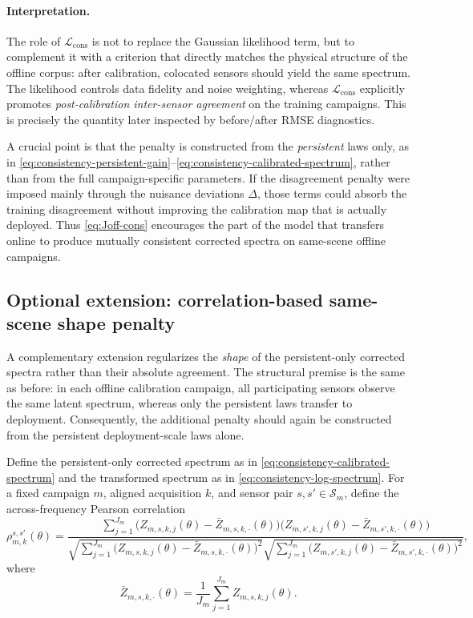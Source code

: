 \paragraph{Interpretation.}
The role of $\mathcal L_{\mathrm{cons}}$ is not to replace the Gaussian
likelihood term, but to complement it with a criterion that directly matches
the physical structure of the offline corpus: after calibration, colocated
sensors should yield the same spectrum. The likelihood controls data fidelity
and noise weighting, whereas $\mathcal L_{\mathrm{cons}}$ explicitly promotes
\emph{post-calibration inter-sensor agreement} on the training campaigns.
This is precisely the quantity later inspected by before/after RMSE
diagnostics.

A crucial point is that the penalty is constructed from the \emph{persistent}
laws only, as in
\eqref{eq:consistency-persistent-gain}--\eqref{eq:consistency-calibrated-spectrum},
rather than from the full campaign-specific parameters. If the disagreement
penalty were imposed mainly through the nuisance deviations $\Delta$, those
terms could absorb the training disagreement without improving the calibration
map that is actually deployed. Thus
\eqref{eq:Joff-cons} encourages the part of the model that transfers online to
produce mutually consistent corrected spectra on same-scene offline campaigns.

\subsection{Optional extension: correlation-based same-scene shape penalty}

A complementary extension regularizes the \emph{shape} of the persistent-only
corrected spectra rather than their absolute agreement. The structural premise
is the same as before: in each offline calibration campaign, all participating
sensors observe the same latent spectrum, whereas only the persistent laws
transfer to deployment. Consequently, the additional penalty should again be
constructed from the persistent deployment-scale laws alone.

Define the persistent-only corrected spectrum as in
\eqref{eq:consistency-calibrated-spectrum} and the transformed spectrum as in
\eqref{eq:consistency-log-spectrum}. For a fixed campaign $m$, aligned
acquisition $k$, and sensor pair
$s,s'\in\mathcal S_m$, define the across-frequency Pearson correlation
\begin{equation}
\rho_{m,k}^{s,s'}(\theta)
=
\frac{
\sum_{j=1}^{J_m}
\bigl(
Z_{m,s,k,j}(\theta)
-
\bar Z_{m,s,k,\cdot}(\theta)
\bigr)
\bigl(
Z_{m,s',k,j}(\theta)
-
\bar Z_{m,s',k,\cdot}(\theta)
\bigr)
}{
\sqrt{
\sum_{j=1}^{J_m}
\bigl(
Z_{m,s,k,j}(\theta)
-
\bar Z_{m,s,k,\cdot}(\theta)
\bigr)^2
}
\sqrt{
\sum_{j=1}^{J_m}
\bigl(
Z_{m,s',k,j}(\theta)
-
\bar Z_{m,s',k,\cdot}(\theta)
\bigr)^2
}
},
\label{eq:corr-pairwise-correlation}
\end{equation}
where
\begin{equation}
\bar Z_{m,s,k,\cdot}(\theta)
=
\frac{1}{J_m}
\sum_{j=1}^{J_m}
Z_{m,s,k,j}(\theta).
\label{eq:corr-sensor-frequency-mean}
\end{equation}

